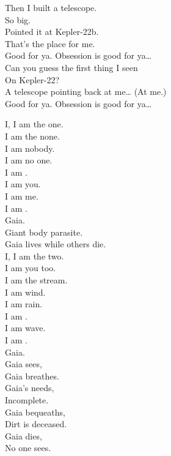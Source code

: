 Then I built a telescope. \\
So big. \\
Pointed it at Kepler-22b. \\
That's the place for me. \\

Good for ya. Obsession is good for ya… \\

Can you guess the first thing I seen \\
On Kepler-22? \\
A telescope pointing back at me… (At me.) \\

Good for ya. Obsession is good for ya… \\





I, I am the one. \\
I am the none. \\
I am nobody. \\
I am no one. \\
I am . \\
I am you. \\
I am me. \\

I am . \\
Gaia. \\

Giant body parasite. \\
Gaia lives while others die. \\

I, I am the two. \\
I am you too. \\
I am the stream. \\
I am wind. \\
I am rain. \\
I am . \\
I am wave. \\

I am . \\
Gaia. \\

Gaia sees, \\
Gaia breathes. \\
Gaia's needs, \\
Incomplete. \\
Gaia bequeaths, \\
Dirt is deceased. \\
Gaia dies, \\
No one sees. \\

